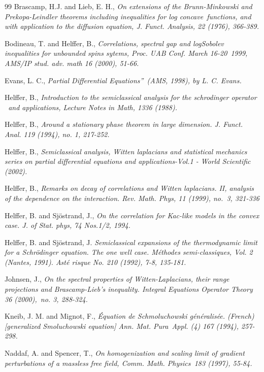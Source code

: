 \documentclass{article}
\begin{document}
\begin{thebibliography}{99}
\bibitem{} Brascamp, H.J. and Lieb, E. H., \textit{On extensions of the
Brunn-Minkowski and Prekopa-Leindler theorems including inequalities for log
concave\ functions, and with application to the diffusion equation, J.
Funct. Analysis, 22 (1976), 366-389.}

\bibitem{} Bodineau, T. and Helffer, B., \textit{Correlations, spectral gap
and logSobolev inequalities for unbounded spins sytems, Proc. UAB Conf.
March 16-20\ 1999, AMS/IP stud. adv. math 16 (2000), 51-66.}

\bibitem{} Evans, L. C., \textit{Partial Differential
Equations\textquotedblright\ (AMS, 1998), by L. C. Evans.}

\bibitem{} Helffer, B., \textit{Introduction to the semiclassical analysis
for the schrodinger operator \ and applications, Lecture Notes in Math, 1336
(1988).}

\bibitem{} Helffer, B., \textit{Around a stationary phase theorem in large
dimension. J. Funct. Anal. 119 (1994), no. 1, 217-252.}

\bibitem{} Helffer, B., \textit{Semiclassical analysis, Witten laplacians
and statistical mechanics series on partial differential equations and
applications-Vol.1 - World Scientific (2002).}

\bibitem{} Helffer, B., \textit{Remarks on decay of correlations and Witten
laplacians. II, analysis of the dependence on the interaction. Rev. Math.
Phys, 11 (1999), no.\ 3, 321-336}

\bibitem{} Helffer, B. and Sj\"{o}strand, J., \textit{On the correlation for
Kac-like models in the convex case. J. of Stat. phys, 74 Nos.1/2, 1994.}

\bibitem{} Helffer, B. and Sj\"{o}strand, J. \textit{Semiclassical
expansions of the thermodynamic limit for a Schr\"{o}dinger equation. The
one well case. M\'{e}thodes semi-classiques, Vol. 2 (Nantes, 1991). Ast\'{e}%
risque No. 210 (1992), 7-8, 135-181.}

\bibitem{} Johnsen, J., \textit{On the spectral properties of
Witten-Laplacians, their range projections and Brascamp-Lieb's inequality.
Integral Equations Operator Theory 36 (2000),\ no. 3, 288-324.}

\bibitem{} Kneib, J. M. and Mignot, F., \textit{\'{E}quation de
Schmoluchowski g\'{e}n\'{e}ralis\'{e}e. (French) [generalized Smoluchowski
equation] Ann. Mat. Pura\ Appl. (4) 167 (1994), 257-298.}

\bibitem{} Naddaf, A. and Spencer, T., \textit{On homogenization and scaling
limit of gradient perturbations of a massless free field, Comm. Math.
Physics\ 183 (1997), 55-84.}


\end{thebibliography}
\end{document}
